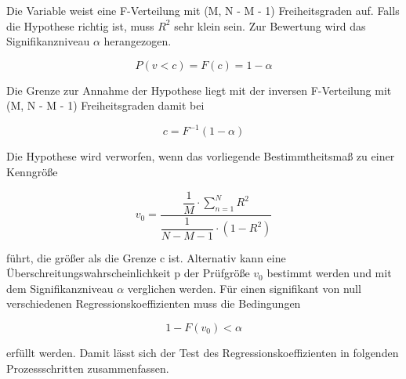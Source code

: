 \noindent Die Variable weist eine F-Verteilung mit (M, N - M - 1) Freiheitsgraden auf. Falls die Hypothese richtig ist, muss $R^{2}$ sehr klein sein. Zur Bewertung wird das Signifikanzniveau $\alpha$ herangezogen.

\begin{equation}\label{eq:twelveonehundredtwentytwo}
P(v<c)=F(c)=1-\alpha
\end{equation}

\noindent Die Grenze zur Annahme der Hypothese liegt mit der inversen F-Verteilung mit (M, N - M - 1) Freiheitsgraden damit bei

\begin{equation}\label{eq:twelveonehundredtwentythree}
c=F^{-1} (1-\alpha)
\end{equation}

\noindent Die Hypothese wird verworfen, wenn das vorliegende Bestimmtheitsma{\ss} zu einer Kenngr\"{o}{\ss}e

\begin{equation}\label{eq:twelveonehundredtwentyfour}
v_{0} =\dfrac{\dfrac{1}{M} \cdot \displaystyle\sum\limits _{n=1}^{N}R^{2}}{\dfrac{1}{N-M-1} \cdot \left(1-R^{2} \right)}
\end{equation}

\noindent f\"{u}hrt, die gr\"{o}{\ss}er als die Grenze c ist. Alternativ kann eine \"{U}berschreitungswahrscheinlichkeit p der Pr\"{u}fgr\"{o}{\ss}e $v_{0}$ bestimmt werden und mit dem Signifikanzniveau $\alpha$ verglichen werden. F\"{u}r einen signifikant von null verschiedenen Regressionskoeffizienten muss die Bedingungen

\begin{equation}\label{eq:twelveonehundredtwentyfive}
1-F(v_{0})<\alpha
\end{equation}

\noindent erf\"{u}llt werden. Damit l\"{a}sst sich der Test des Regressionskoeffizienten in folgenden Prozessschritten zusammenfassen.

\clearpage

